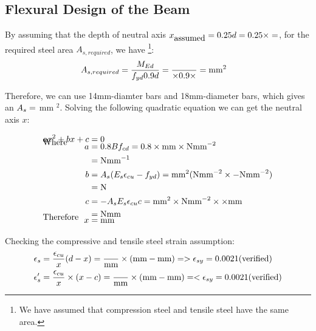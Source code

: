\subsection{Flexural Design of the Beam}
By assuming that the depth of neutral axis $x_{\mbox{assumed}} = 0.25d = 0.25
\times \g{d} = \g{xa}$, for the required steel area $A_{s,required}$, we have
\footnote{We have assumed that compression steel and tensile steel have the same area.}:
\begin{align*}
  A_{s,required} &= \frac{M_{Ed}}{f_{yd}0.9d}
                   =  \frac{\g{MEd}}{\g{fyd} \times 0.9  \times \g{d}}
                   = \g{Asr} \mbox{mm}^{2}
\end{align*}

Therefore, we can use  14mm-diamter bars and 
18mm-diameter bars, which gives an $A_{s} = \g{As}$ mm $^{2}$. Solving the
following quadratic equation we can get the neutral axis $x$:

\begin{align*}
  a x^{2} + b x + c &= 0 \\
  \\[-1cm]               %
  \intertext{Where}
  \\[-1cm]               %
  a &= 0.8Bf_{cd}
      = 0.8 \times \g{b}\mbox{mm} \times \g{fcd} \mbox{Nmm}^{-2} \\
                    &= \g{qea} \mbox{Nmm}^{-1}\\
  b &= A_{s} (E_{s} \epsilon_{cu} - f_{yd})
      = \g{As}\mbox{mm}^{2} (\g{Es}\mbox{Nmm}^{-2}
      \times
      \g{epcu} - \g{fyd}\mbox{Nmm}^{-2}) \\
                    &= \g{qeb} \mbox{N}\\
  c &= - A_{s} E_{s} \epsilon_{cu} c
      = \g{As} \mbox{mm}^{2} \times \g{Es} \mbox{Nmm}^{-2}
      \times \g{epcu} \times \g{c} \mbox{mm} \\
                    &= \g{qec} \mbox{Nmm}\\
  \\[-1cm]               %
  \intertext{Therefore}
  \\[-1cm]               %
  x &= \g{x} \mbox{mm}
\end{align*}

Checking the compressive and tensile steel strain assumption:
\begin{align*}
  \epsilon_{s} &= \frac{\epsilon_{cu}}{x} (d - x) 
               =  \frac{\g{epcu}}{\g{x}\mbox{mm}} 
                 \times (\g{d} \mbox{mm} - \g{x} \mbox{mm})
                 = \g{eps}
               > \epsilon_{sy} = 0.0021 \mbox{(verified)} \\
  \epsilon_{s}' &= \frac{\epsilon_{cu}}{x} \times (x - c) 
               = \frac{\g{epcu}}{\g{x}\mbox{mm}} \times
                  (\g{x}\mbox{mm} - \g{c}\mbox{mm})
                  = \g{epsp}
                  < \epsilon_{sy} = 0.0021 \mbox{(verified)}
\end{align*}

